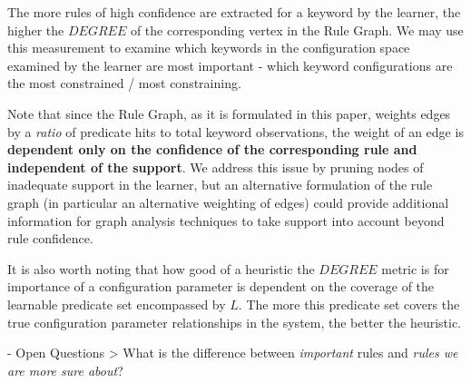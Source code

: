 \fi


The more rules of high confidence are extracted for a keyword by the learner, 
the higher the $DEGREE$ of the corresponding vertex in the Rule Graph.
We may use this measurement to examine which keywords in the configuration
space examined by the learner are most important - which keyword configurations
are the most constrained / most constraining.

Note that since the Rule Graph, as it is formulated in this paper, weights edges
by a {\it ratio} of predicate hits to total keyword observations, the weight
of an edge is {\bf dependent only on the confidence of the corresponding rule
and independent of the support}. We address this issue by pruning nodes of
inadequate support in the learner, but an alternative formulation of the rule
graph (in particular an alternative weighting of edges)
could provide additional
information for graph analysis techniques to take support into account
beyond rule confidence.


It is also worth noting that how good of a heuristic the $DEGREE$ metric is for
importance of a configuration parameter is dependent on the coverage
of the learnable predicate set encompassed by $L$. The more this predicate
set covers the true configuration parameter relationships in the system,
the better the heuristic.

\iffalse

Intuitively, keywords that are seen together more often with defined relationships are more likely to generate rules within the learner.
 (it would be nice to show this with a quick derivation)

for a rule to be considered *true*, two conditions must hold:

1) adequate support -we have seen the keywords together x number of times

2) adequate confidence - how many times out of the x number of times was the relationship true?

\fi

\iffalse
- Open Questions
> What is the difference between {\it important} rules and
  {\it rules we are more sure about}?

